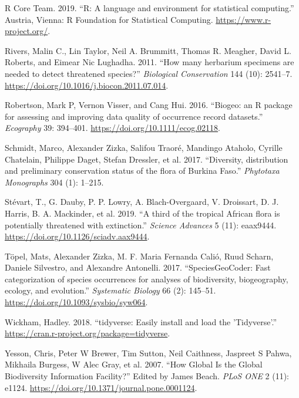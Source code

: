 \documentclass[fleqn,10pt,lineno]{wlpeerj} %
\begin{document}
\leavevmode\hypertarget{ref-rcoreteam2019}{}%
R Core Team. 2019. ``R: A language and environment for statistical computing.'' Austria, Vienna: R Foundation for Statistical Computing. \url{https://www.r-project.org/}.

\leavevmode\hypertarget{ref-Rivers2011}{}%
Rivers, Malin C., Lin Taylor, Neil A. Brummitt, Thomas R. Meagher, David L. Roberts, and Eimear Nic Lughadha. 2011. ``How many herbarium specimens are needed to detect threatened species?'' \emph{Biological Conservation} 144 (10): 2541--7. \url{https://doi.org/10.1016/j.biocon.2011.07.014}.

\leavevmode\hypertarget{ref-Robertson2016}{}%
Robertson, Mark P, Vernon Visser, and Cang Hui. 2016. ``Biogeo: an R package for assessing and improving data quality of occurrence record datasets.'' \emph{Ecography} 39: 394--401. \url{https://doi.org/10.1111/ecog.02118}.

\leavevmode\hypertarget{ref-Schmidt2017}{}%
Schmidt, Marco, Alexander Zizka, Salifou Traoré, Mandingo Ataholo, Cyrille Chatelain, Philippe Daget, Stefan Dressler, et al. 2017. ``Diversity, distribution and preliminary conservation status of the flora of Burkina Faso.'' \emph{Phytotaxa Monographs} 304 (1): 1--215.

\leavevmode\hypertarget{ref-Stevart2019}{}%
Stévart, T., G. Dauby, P. P. Lowry, A. Blach-Overgaard, V. Droissart, D. J. Harris, B. A. Mackinder, et al. 2019. ``A third of the tropical African flora is potentially threatened with extinction.'' \emph{Science Advances} 5 (11): eaax9444. \url{https://doi.org/10.1126/sciadv.aax9444}.

\leavevmode\hypertarget{ref-Topel2017}{}%
Töpel, Mats, Alexander Zizka, M. F. Maria Fernanda Calió, Ruud Scharn, Daniele Silvestro, and Alexandre Antonelli. 2017. ``SpeciesGeoCoder: Fast categorization of species occurrences for analyses of biodiversity, biogeography, ecology, and evolution.'' \emph{Systematic Biology} 66 (2): 145--51. \url{https://doi.org/10.1093/sysbio/syw064}.

\leavevmode\hypertarget{ref-Wickham2018}{}%
Wickham, Hadley. 2018. ``tidyverse: Easily install and load the 'Tidyverse'.'' \url{https://cran.r-project.org/package=tidyverse}.

\leavevmode\hypertarget{ref-Yesson2007}{}%
Yesson, Chris, Peter W Brewer, Tim Sutton, Neil Caithness, Jaspreet S Pahwa, Mikhaila Burgess, W Alec Gray, et al. 2007. ``How Global Is the Global Biodiversity Information Facility?'' Edited by James Beach. \emph{PLoS ONE} 2 (11): e1124. \url{https://doi.org/10.1371/journal.pone.0001124}.
\end{document}
